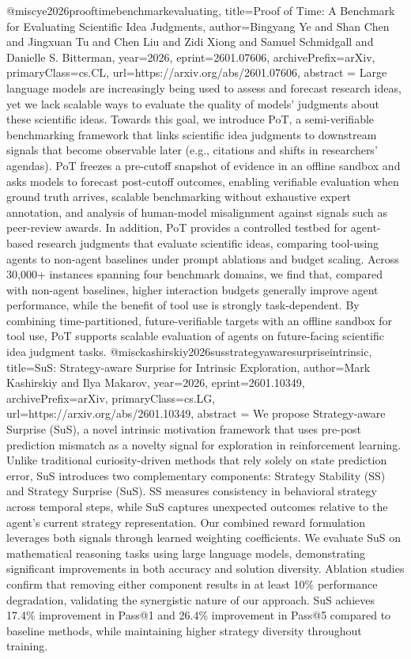 {}@misc{ye2026prooftimebenchmarkevaluating,
      title={Proof of Time: A Benchmark for Evaluating Scientific Idea Judgments}, 
      author={Bingyang Ye and Shan Chen and Jingxuan Tu and Chen Liu and Zidi Xiong and Samuel Schmidgall and Danielle S. Bitterman},
      year={2026},
      eprint={2601.07606},
      archivePrefix={arXiv},
      primaryClass={cs.CL},
      url={https://arxiv.org/abs/2601.07606},
      abstract = {Large language models are increasingly being used to assess and forecast research ideas, yet we lack scalable ways to evaluate the quality of models' judgments about these scientific ideas. Towards this goal, we introduce PoT, a semi-verifiable benchmarking framework that links scientific idea judgments to downstream signals that become observable later (e.g., citations and shifts in researchers' agendas). PoT freezes a pre-cutoff snapshot of evidence in an offline sandbox and asks models to forecast post-cutoff outcomes, enabling verifiable evaluation when ground truth arrives, scalable benchmarking without exhaustive expert annotation, and analysis of human-model misalignment against signals such as peer-review awards. In addition, PoT provides a controlled testbed for agent-based research judgments that evaluate scientific ideas, comparing tool-using agents to non-agent baselines under prompt ablations and budget scaling. Across 30,000+ instances spanning four benchmark domains, we find that, compared with non-agent baselines, higher interaction budgets generally improve agent performance, while the benefit of tool use is strongly task-dependent. By combining time-partitioned, future-verifiable targets with an offline sandbox for tool use, PoT supports scalable evaluation of agents on future-facing scientific idea judgment tasks.}
}@misc{kashirskiy2026susstrategyawaresurpriseintrinsic,
      title={SuS: Strategy-aware Surprise for Intrinsic Exploration}, 
      author={Mark Kashirskiy and Ilya Makarov},
      year={2026},
      eprint={2601.10349},
      archivePrefix={arXiv},
      primaryClass={cs.LG},
      url={https://arxiv.org/abs/2601.10349},
      abstract = {We propose Strategy-aware Surprise (SuS), a novel intrinsic motivation framework that uses pre-post prediction mismatch as a novelty signal for exploration in reinforcement learning. Unlike traditional curiosity-driven methods that rely solely on state prediction error, SuS introduces two complementary components: Strategy Stability (SS) and Strategy Surprise (SuS). SS measures consistency in behavioral strategy across temporal steps, while SuS captures unexpected outcomes relative to the agent's current strategy representation. Our combined reward formulation leverages both signals through learned weighting coefficients. We evaluate SuS on mathematical reasoning tasks using large language models, demonstrating significant improvements in both accuracy and solution diversity. Ablation studies confirm that removing either component results in at least 10\% performance degradation, validating the synergistic nature of our approach. SuS achieves 17.4\% improvement in Pass@1 and 26.4\% improvement in Pass@5 compared to baseline methods, while maintaining higher strategy diversity throughout training.}
}

